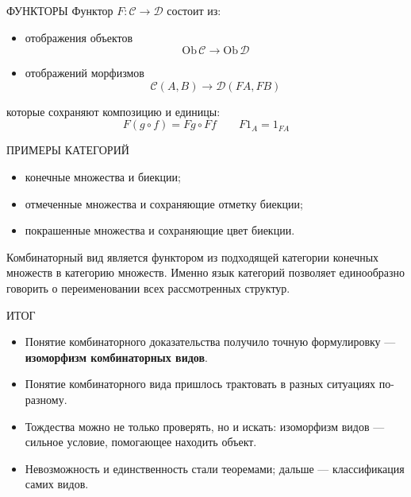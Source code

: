 \documentclass[aspectratio=169,11pt]{beamer}
\begin{document}
\begin{cttextframe}{ФУНКТОРЫ}
Функтор $F\colon\mathcal C\to\mathcal D$ состоит из:
\begin{itemize}
  \item отображения объектов
    \[
      \mathrm{Ob}\,\mathcal C\longrightarrow\mathrm{Ob}\,\mathcal D
    \]
  \item отображений морфизмов
    \[
      \mathcal C(A,B)\longrightarrow\mathcal D(FA,FB)
    \]
\end{itemize}
которые сохраняют композицию и единицы:
\[
  F(g\circ f)=Fg\circ Ff
  \qquad
  F1_A=1_{FA}
\]
\end{cttextframe}

\begin{cttextframe}{ПРИМЕРЫ КАТЕГОРИЙ}
\begin{itemize}
  \item конечные множества и биекции;
  \item отмеченные множества и сохраняющие отметку биекции;
  \item покрашенные множества и сохраняющие цвет биекции.
\end{itemize}

Комбинаторный вид является функтором из подходящей категории конечных
множеств в категорию множеств. Именно язык категорий позволяет единообразно
говорить о переименовании всех рассмотренных структур.
\end{cttextframe}

\begin{cttextframe}{ИТОГ}
\begin{itemize}
  \item Понятие комбинаторного доказательства получило точную
    формулировку — \textbf{изоморфизм комбинаторных видов}.
  \item Понятие комбинаторного вида пришлось трактовать в разных
    ситуациях по-разному.
  \item Тождества можно не только проверять, но и искать:
    изоморфизм видов — сильное условие, помогающее находить объект.
  \item Невозможность и единственность стали теоремами; дальше —
    классификация самих видов.
\end{itemize}
\end{cttextframe}

\LectureClosingFrame
\end{document}
